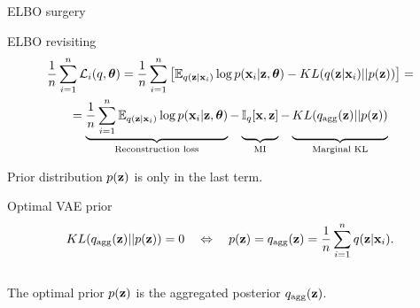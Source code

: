 \begin{frame}{ELBO surgery}
	\begin{block}{ELBO revisiting}
		\vspace{-0.7cm}
		\begin{multline*}
		    \frac{1}{n}\sum_{i=1}^n \cL_i(q, \btheta) = \frac{1}{n} \sum_{i=1}^n \left[ \mathbb{E}_{q(\bz | \bx_i)} \log p(\bx_i | \bz, \btheta) - KL(q(\bz | \bx_i) || p(\bz)) \right] = \\
		    = \underbrace{\frac{1}{n} \sum_{i=1}^n \mathbb{E}_{q(\bz | \bx_i)} \log p(\bx_i | \bz, \btheta)}_{\text{Reconstruction loss}} - \underbrace{\vphantom{ \sum_{i=1}^n} \bbI_q [\bx, \bz]}_{\text{MI}} - \underbrace{\vphantom{ \sum_{i=1}^n} KL(q_{\text{agg}}(\bz) || p(\bz))}_{\text{Marginal KL}}
		\end{multline*}
		\vspace{-0.3cm}
	\end{block}
	Prior distribution $p(\mathbf{z})$ is only in the last term.
	\begin{block}{Optimal VAE prior}
		\vspace{-0.7cm}
		\[
	  		KL(q_{\text{agg}}(\mathbf{z}) || p(\mathbf{z})) = 0 \quad \Leftrightarrow \quad p (\mathbf{z}) = q_{\text{agg}}(\mathbf{z}) = \frac{1}{n} \sum_{i=1}^n q(\mathbf{z} | \mathbf{x}_i).
		\]
		\vspace{-0.4cm} \\
		The optimal prior $p(\mathbf{z})$ is the aggregated posterior $q_{\text{agg}}(\mathbf{z})$.
	\end{block}
	
\end{frame}
